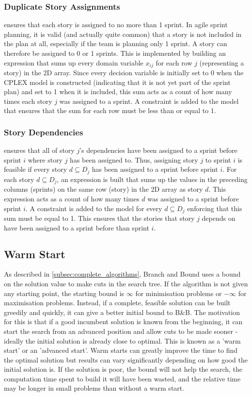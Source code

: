 \subsubsection{Duplicate Story Assignments}
 ensures that each story is assigned to no more than 1 sprint. In agile sprint planning, it is valid (and actually quite common) that a story is not included in the plan at all, especially if the team is planning only 1 sprint. A story can therefore be assigned to 0 or 1 sprints. This is implemented by building an expression that sums up every domain variable $x_{ij}$ for each row $j$ (representing a story) in the 2D array. Since every decision variable is initially set to 0 when the CPLEX model is constructed (indicating that it is not yet part of the sprint plan) and set to 1 when it is included, this sum acts as a count of how many times each story $j$ was assigned to a sprint. A constraint is added to the model that ensures that the sum for each row must be less than or equal to 1.

\subsubsection{Story Dependencies}
 ensures that all of story $j$'s dependencies have been assigned to a sprint before sprint $i$ where story $j$ has been assigned to. Thus, assigning story $j$ to sprint $i$ is feasible if every story $d \subseteq D_j$ has been assigned to a sprint before sprint $i$. For each story $d \subseteq D_j$, an expression is built that sums up the values in the preceding columns (sprints) on the same row (story) in the 2D array as story $d$. This expression acts as a count of how many times $d$ was assigned to a sprint before sprint $i$. A constraint is added to the model for every $d \subseteq D_j$ enforcing that this sum must be equal to 1. This ensures that the stories that story $j$ depends on have been assigned to a sprint before than sprint $i$.

\subsection{Warm Start} \label{subsec:warm_start}
As described in \cref{subsec:complete_algorithms}, Branch and Bound uses a bound on the solution value to make cuts in the search tree. If the algorithm is not given any starting point, the starting bound is $\infty$ for minimisation problems or $-\infty$ for maximisation problems. Instead, if a complete, feasible solution can be built greedily and quickly, it can give a better initial bound to B\&B. The motivation for this is that if a good incumbent solution is known from the beginning, it can start the search from an advanced position and allow cuts to be made sooner - ideally the initial solution is already close to optimal. This is known as a 'warm start' or an 'advanced start'. Warm starts can greatly improve the time to find the optimal solution but results can vary significantly depending on how good the initial solution is. If the solution is poor, the bound will not help the search, the computation time spent to build it will have been wasted, and the relative time may be longer in small problems than without a warm start.

